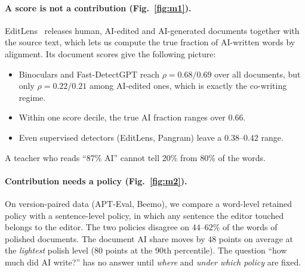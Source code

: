 \documentclass[10pt]{article}
\begin{document}
\paragraph{A score is not a contribution (Fig.~\ref{fig:m1}).}
EditLens~\cite{editlens} releases human, AI-edited and AI-generated documents together with the source text, which lets us compute the true fraction of AI-written words by alignment. Its document scores give the following picture:
\begin{itemize}
\item Binoculars and Fast-DetectGPT reach $\rho=0.68/0.69$ over all documents, but only $\rho=0.22/0.21$ among AI-edited ones, which is exactly the co-writing regime.
\item Within one score decile, the true AI fraction ranges over $0.66$.
\item Even supervised detectors (EditLens, Pangram) leave a $0.38$--$0.42$ range.
\end{itemize}
A teacher who reads ``87\% AI'' cannot tell 20\% from 80\% of the words.

\paragraph{Contribution needs a policy (Fig.~\ref{fig:m2}).}
On version-paired data (APT-Eval, Beemo), we compare a word-level retained policy with a sentence-level policy, in which any sentence the editor touched belongs to the editor. The two policies disagree on $44$--$62\%$ of the words of polished documents. The document AI share moves by $48$ points on average at the \emph{lightest} polish level ($80$ points at the 90th percentile). The question ``how much did AI write?'' has no answer until \emph{where} and \emph{under which policy} are fixed.
\end{document}
